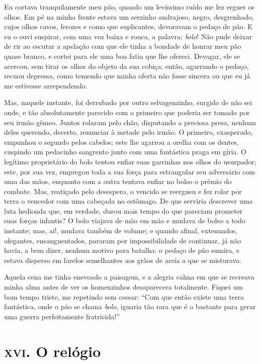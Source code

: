 Eu cortava tranquilamente meu pão, quando um levíssimo ruído me fez
erguer os olhos. Em pé na minha frente estava um serzinho andrajoso,
negro, desgrenhado, cujos olhos cavos, ferozes e como que suplicantes,
devoravam o pedaço de pão. E eu o ouvi suspirar, com uma voz baixa e
rouca, a palavra: \textit{bolo}! Não pude deixar de rir ao escutar a apelação
com que ele tinha a bondade de honrar meu pão quase branco, e cortei
para ele uma boa fatia que lhe ofereci. Devagar, ele se acercou,
sem tirar os olhos do objeto da sua cobiça; então, agarrando o pedaço,
recuou depressa, como temendo que minha oferta não fosse sincera ou
que eu já me estivesse arrependendo.

Mas, naquele instante, foi derrubado por outro selvagenzinho, surgido de
não sei onde, e tão absolutamente parecido com o primeiro que poderia
ser tomado por seu irmão gêmeo. Juntos rolaram pelo chão, disputando a
preciosa presa, nenhum deles querendo, decerto, renunciar à metade
pelo irmão. O primeiro, exasperado, empunhou o segundo pelos cabelos;
este lhe agarrou a orelha com os dentes, cuspindo um pedacinho
sangrento junto com uma fantástica praga em gíria. O legítimo proprietário do
bolo tentou enfiar suas garrinhas nos olhos do usurpador; este,
por sua vez, empregou toda a sua força para estrangular seu
adversário com uma das mãos, enquanto com a outra tentava enfiar no
bolso o prêmio do combate. Mas, reatiçado pelo desespero, o vencido
se reergueu e fez rolar por terra o vencedor com uma cabeçada no
estômago. De que serviria descrever uma luta hedionda que, em verdade,
durou mais tempo do que pareciam prometer suas forças infantis? O bolo
viajava de mão em mão e mudava de bolso a todo instante; mas, ai!,
mudava também de volume; e quando afinal, extenuados, ofegantes,
ensanguentados, pararam por impossibilidade de continuar, já não
havia, a bem dizer, nenhum motivo para batalha: o pedaço de pão sumira, e
estava disperso em farelos semelhantes aos grãos de areia a que se
misturava.

Aquela cena me tinha enevoado a paisagem, e a alegria calma em que
se recreava minha alma antes de ver os homenzinhos
desaparecera totalmente. Fiquei um bom tempo triste, me repetindo sem
cessar: ``Com que então existe uma terra fantástica, onde o pão
se chama \textit{bolo}, iguaria tão rara que é o bastante para gerar uma
guerra perfeitamente fratricida!''

\chapter{\textsc{xvi.} O relógio}

